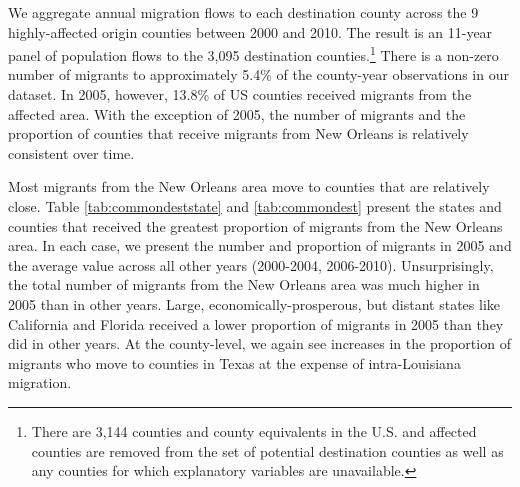 \documentclass[]{article}
\begin{document}
We aggregate annual migration flows to each destination county across
the 9 highly-affected origin counties between 2000 and 2010. The result
is an 11-year panel of population flows to the 3,095 destination
counties.\footnote{There are 3,144 counties and county equivalents in
  the U.S. and affected counties are removed from the set of potential
  destination counties as well as any counties for which explanatory
  variables are unavailable.} There is a non-zero number of migrants to
approximately 5.4\% of the county-year observations in our dataset. In
2005, however, 13.8\% of US counties received migrants from the affected
area. With the exception of 2005, the number of migrants and the
proportion of counties that receive migrants from New Orleans is
relatively consistent over time.

Most migrants from the New Orleans area move to counties that are
relatively close. Table \ref{tab:commondeststate} and
\ref{tab:commondest} present the states and counties that received the
greatest proportion of migrants from the New Orleans area. In each case,
we present the number and proportion of migrants in 2005 and the average
value across all other years (2000-2004, 2006-2010). Unsurprisingly, the
total number of migrants from the New Orleans area was much higher in
2005 than in other years. Large, economically-prosperous, but distant
states like California and Florida received a lower proportion of
migrants in 2005 than they did in other years. At the county-level, we
again see increases in the proportion of migrants who move to counties
in Texas at the expense of intra-Louisiana migration.
\end{document}
